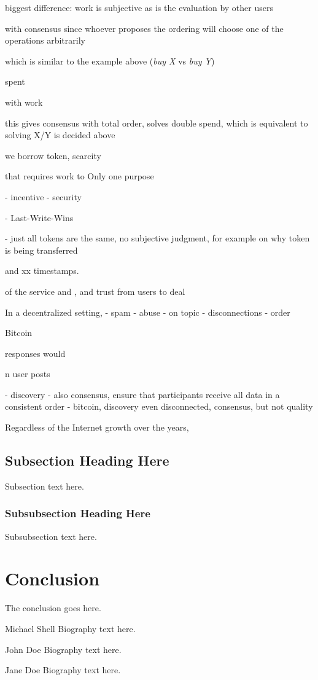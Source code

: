 \documentclass[10pt,journal,compsoc]{IEEEtran}
\begin{document}
biggest difference:
work is subjective as is the evaluation by other users


 with consensus since
whoever proposes the ordering will choose one of the operations arbitrarily


 which is similar to the
example above (\emph{buy X} vs \emph{buy Y})

spent

with work



this gives consensus with total order, solves double spend, which is equivalent
to solving X/Y is decided above

we borrow token, scarcity


 that requires work to 
Only one purpose


- incentive
- security

- Last-Write-Wins

- just all tokens are the same, no subjective judgment, for example on why token is being transferred


 and xx timestamps.


 of the service and , and trust from users to deal

In a decentralized setting, 
    - spam
    - abuse
    - on topic
    - disconnections
    - order

Bitcoin

responses would




n user posts 

- discovery
- also consensus, ensure that participants receive all data in a consistent order
- bitcoin, discovery even disconnected, consensus, but not quality


Regardless of the Internet growth over the years,

\subsection{Subsection Heading Here}
Subsection text here.

\subsubsection{Subsubsection Heading Here}
Subsubsection text here.

\section{Conclusion}
The conclusion goes here.




\begin{IEEEbiography}{Michael Shell}
Biography text here.
\end{IEEEbiography}

\begin{IEEEbiographynophoto}{John Doe}
Biography text here.
\end{IEEEbiographynophoto}

\begin{IEEEbiographynophoto}{Jane Doe}
Biography text here.
\end{IEEEbiographynophoto}
\end{document}
